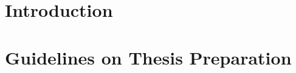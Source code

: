 \documentclass[a4paper]{ustthesis}
\begin{document}


\chapter{Introduction}
\label{chp_intro}

\newpage

\chapter{Guidelines on Thesis Preparation}
\label{chp_background}

\newpage


\end{document}
